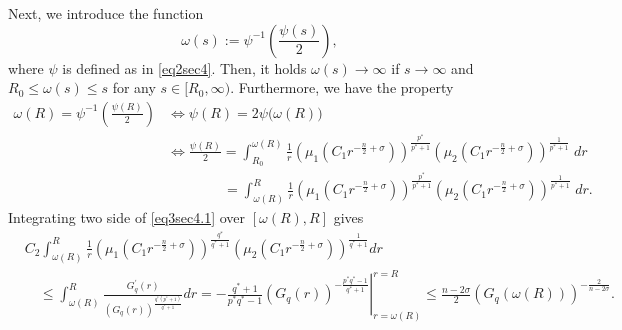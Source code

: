 \documentclass[11pt,reqno]{amsart}
\newcommand{\tron}[1]{\left( #1 \right)}
\numberwithin{equation}{section}
\theoremstyle{plain}
\begin{document}
Next, we introduce the function
$$ \omega(s):=\psi^{-1}\tron{\frac{\psi(s)}{2}}, $$
where $\psi$ is defined as in \eqref{eq2sec4}. Then, it holds $\omega(s)\to \infty$ if $s\to \infty$ and $R_0\leq \omega(s)\leq s$ for any $s\in [R_0,\infty)$. Furthermore, we have the property
\begin{align}
    \omega(R)=\psi^{-1}\tron{\frac{\psi(R)}{2}} &\Leftrightarrow
    \psi(R)=2\psi\big(\omega(R)\big) \nonumber \\
    &\Leftrightarrow \frac{\psi(R)}{2}=\int_{R_0}^{\omega(R)}\frac{1}{r}\left(\mu_1\left(C_1 r^{-\frac{n}{2}+\sigma}\right)\right)^{\frac{p^*}{p^*+1}}\left(\mu_2\left(C_1 r^{-\frac{n}{2}+\sigma}\right)\right)^{\frac{1}{p^*+1}}\;dr \nonumber \\
    &\qquad\qquad =\int_{\omega(R)}^{R}\frac{1}{r}\left(\mu_1\left(C_1 r^{-\frac{n}{2}+\sigma}\right)\right)^{\frac{p^*}{p^*+1}}\left(\mu_2\left(C_1 r^{-\frac{n}{2}+\sigma}\right)\right)^{\frac{1}{p^*+1}}\;dr. \label{eq4sec4.1}
\end{align}
Integrating two side of \eqref{eq3sec4.1} over $\left[\omega(R),R\right]$ gives
\begin{align}
& C_2 \int_{\omega(R)}^{R} \frac{1}{r}\left(\mu_1\left(C_1 r^{-\frac{n}{2}+\sigma}\right)\right)^{\frac{q^*}{q^*+1}}\left(\mu_2\left(C_1 r^{-\frac{n}{2}+\sigma}\right)\right)^{\frac{1}{q^*+1}} d r \nonumber \\
& \quad \leq \int_{\omega(R)}^{R} \frac{G_q^{\prime}(r)}{\left(G_q(r)\right)^{\frac{q^*\left(p^*+1\right)}{q^*+1}}} d r =-\left.\frac{q^*+1}{p^* q^*-1}\left(G_q(r)\right)^{-\frac{p^*q^*-1}{q^*+1}}\right|_{r=\omega(R)} ^{r=R} \leq \frac{n-2\sigma}{2}\left(G_q\left(\omega(R)\right)\right)^{-\frac{2}{n-2\sigma}}. \label{eq5sec4.1}
\end{align}
\end{document}
